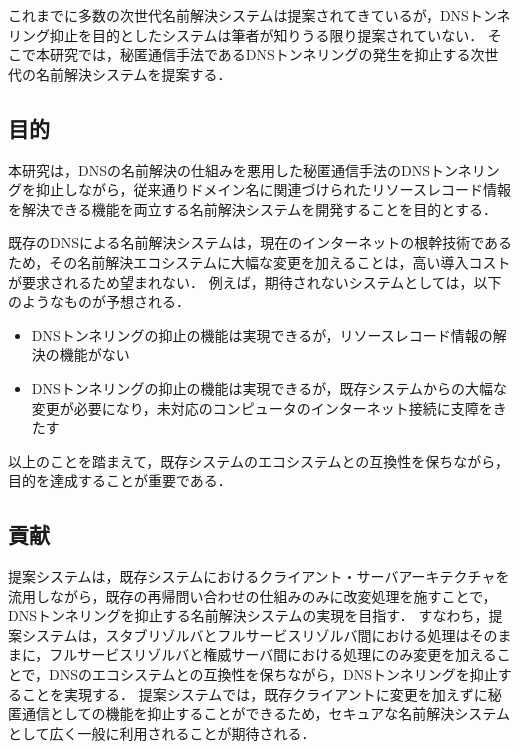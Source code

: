 これまでに多数の次世代名前解決システムは提案されてきているが，DNSトンネリング抑止を目的としたシステムは筆者が知りうる限り提案されていない．
そこで本研究では，秘匿通信手法であるDNSトンネリングの発生を抑止する次世代の名前解決システムを提案する．


\subsection{目的}
本研究は，DNSの名前解決の仕組みを悪用した秘匿通信手法のDNSトンネリングを抑止しながら，従来通りドメイン名に関連づけられたリソースレコード情報を解決できる機能を両立する名前解決システムを開発することを目的とする．

既存のDNSによる名前解決システムは，現在のインターネットの根幹技術であるため，その名前解決エコシステムに大幅な変更を加えることは，高い導入コストが要求されるため望まれない．
例えば，期待されないシステムとしては，以下のようなものが予想される．
\begin{itemize}
 \setlength{\itemsep}{-0.5mm}
 \item DNSトンネリングの抑止の機能は実現できるが，リソースレコード情報の解決の機能がない
 \item DNSトンネリングの抑止の機能は実現できるが，既存システムからの大幅な変更が必要になり，未対応のコンピュータのインターネット接続に支障をきたす
\end{itemize}

以上のことを踏まえて，既存システムのエコシステムとの互換性を保ちながら，目的を達成することが重要である．

\subsection{貢献}
提案システムは，既存システムにおけるクライアント・サーバアーキテクチャを流用しながら，既存の再帰問い合わせの仕組みのみに改変処理を施すことで，DNSトンネリングを抑止する名前解決システムの実現を目指す．
すなわち，提案システムは，スタブリゾルバとフルサービスリゾルバ間における処理はそのままに，フルサービスリゾルバと権威サーバ間における処理にのみ変更を加えることで，DNSのエコシステムとの互換性を保ちながら，DNSトンネリングを抑止することを実現する．
提案システムでは，既存クライアントに変更を加えずに秘匿通信としての機能を抑止することができるため，セキュアな名前解決システムとして広く一般に利用されることが期待される．

